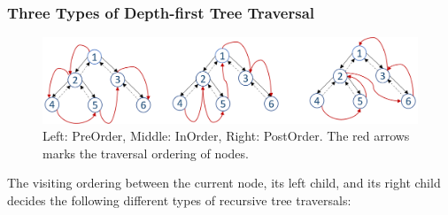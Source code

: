 \documentclass[../main.tex]{subfiles}
\begin{document}


\subsubsection{Three Types of Depth-first Tree Traversal}
\begin{figure}[!ht]
    \centering
    \includegraphics[width = .99\columnwidth]{fig/tree_traversal.png}
    \caption{Left: PreOrder, Middle: InOrder, Right: PostOrder. The red arrows marks the traversal ordering of nodes.}
    \label{fig:binary_tree_traversal}
\end{figure}
The visiting ordering between the current node, its left child, and its right child decides the following different types of recursive tree traversals: 
\end{document}
